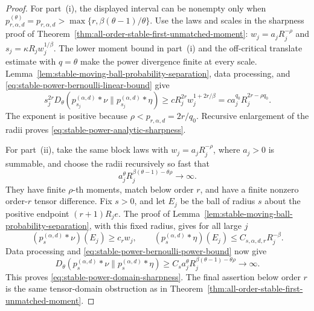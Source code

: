 \begin{proof}
For part~\textup{(i)}, the displayed interval can be nonempty only when
\(p_{r,\alpha,d}^{(\theta)}=p_{r,\alpha,d}>\max\{r,
\beta(\theta-1)/\theta\}\).  Use the laws and scales in the sharpness
proof of Theorem~\ref{thm:all-order-stable-first-unmatched-moment}:
\(w_j=a_jR_j^{-\rho}\) and
\(s_j=\kappa R_jw_j^{1/\beta}\).  The lower moment bound in part~\textup{(i)}
and the off-critical translate estimate with \(q=\theta\) make the power
divergence finite at every scale.  Lemma~\ref{lem:stable-moving-ball-probability-separation},
data processing, and \eqref{eq:stable-power-bernoulli-linear-bound} give
\[
 s_j^{2r}D_\theta(p_{s_j}^{(\alpha,d)}*\nu\|
                   p_{s_j}^{(\alpha,d)}*\eta)
 \ge cR_j^{2r}w_j^{1+2r/\beta}
 =ca_j^{q_0}R_j^{2r-\rho q_0}.
\]
The exponent is positive because \(\rho<p_{r,\alpha,d}=2r/q_0\).
Recursive enlargement of the radii proves
\eqref{eq:stable-power-analytic-sharpness}.

For part~\textup{(ii)}, take the same block laws with
\(w_j=a_jR_j^{-\rho}\), where \(a_j>0\) is summable, and choose the
radii recursively so fast that
\begin{equation}\label{eq:stable-power-domain-radii}
 a_j^\theta R_j^{\beta(\theta-1)-\theta\rho}\longrightarrow\infty.
\end{equation}
They have finite \(\rho\)-th moments, match below order \(r\), and have a
finite nonzero order-\(r\) tensor difference.  Fix \(s>0\), and let \(E_j\)
be the ball of radius \(s\) about the positive endpoint
\((r+1)R_je\).  The proof of
Lemma~\ref{lem:stable-moving-ball-probability-separation}, with this fixed
radius, gives for all large \(j\)
\[
 (p_s^{(\alpha,d)}*\nu)(E_j)\ge c_rw_j,
 \qquad
 (p_s^{(\alpha,d)}*\eta)(E_j)\le C_{s,\alpha,d,r}R_j^{-\beta}.
\]
Data processing and \eqref{eq:stable-power-bernoulli-power-bound} now give
\[
 D_\theta(p_s^{(\alpha,d)}*\nu\|
          p_s^{(\alpha,d)}*\eta)
 \ge C_s a_j^\theta
 R_j^{\beta(\theta-1)-\theta\rho}\longrightarrow\infty.
\]
This proves \eqref{eq:stable-power-domain-sharpness}.  The final assertion
below order \(r\) is the same tensor-domain obstruction as in
Theorem~\ref{thm:all-order-stable-first-unmatched-moment}.
\end{proof}
